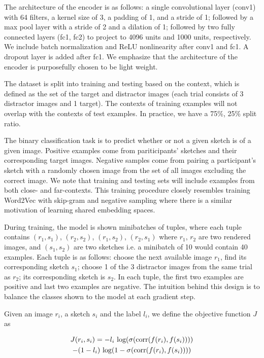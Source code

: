 \documentclass[9pt,twocolumn,twoside]{pnas-new}
\begin{document}
{The architecture of the encoder is as follows: a single convolutional layer (conv1) with 64 filters, a kernel size of 3, a padding of 1, and a stride of 1; followed by a max pool layer with a stride of 2 and a dilation of 1; followed by two fully connected layers (fc1, fc2) to project to 4096 units and 1000 units, respectively. We include batch normalization and ReLU nonlinearity after conv1 and fc1. A dropout layer is added after fc1. We emphasize that the architecture of the encoder is purposefully chosen to be light weight.


The dataset is split into training and testing based on the context, which is defined as the set of the target and distractor images (each trial consists of 3 distractor images and 1 target). The contexts of training examples will not overlap with the contexts of test examples. In practice, we have a 75\%, 25\% split ratio.

The binary classification task is to predict whether or not a given sketch is of a given image. Positive examples come from pariticipants' sketches and their corresponding target images. Negative samples come from pairing a participant's sketch with a randomly chosen image from the set of all images excluding the correct image. We note that training and testing sets will include examples from both close- and far-contexts. This training procedure closely resembles training Word2Vec with skip-gram and negative sampling where there is a similar motivation of learning shared embedding spaces.

During training, the model is shown minibatches of tuples, where each tuple contains $(r_{1}, s_{1})$, $(r_{2}, s_{2})$, $(r_{1}, s_{2})$, $(r_{2}, s_{1})$ where $r_{1}$, $r_{2}$ are two rendered images, and $(s_{1}, s_{2})$ are two sketches i.e. a minibatch of 10 would contain 40 examples. Each tuple is as follows: choose the next available image $r_{1}$, find its corresponding sketch $s_{1}$; choose 1 of the 3 distractor images from the same trial as $r_{2}$; its corresponding sketch is $s_{2}$. In each tuple, the first two examples are positive and last two examples are negative. The intuition behind this design is to balance the classes shown to the model at each gradient step.

Given an image $r_{i}$, a sketch $s_{i}$ and the label $l_{i}$, we define the objective function $J$ as

\begin{multline}
    J(r_{i}, s_{i}) = -l_{i} \textup{ log}(\sigma(\textup{corr}(f(r_{i}), f(s_{i})))) \\ - (1 - l_{i}) \textup{ log}(1 - \sigma(\textup{corr}(f(r_{i}), f(s_{i}))))
\end{multline}

}
\end{document}
